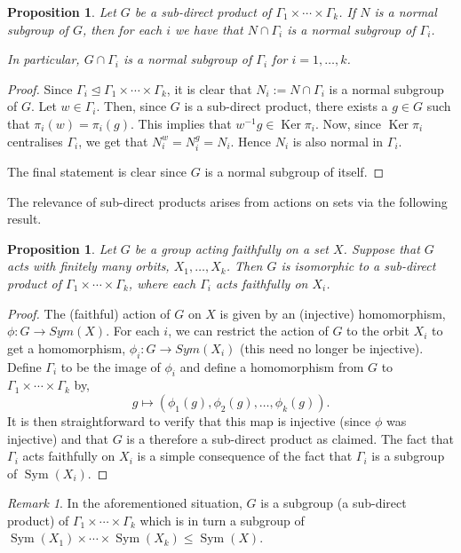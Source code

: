 \documentclass[11pt,a4paper]{amsart}
\newtheorem{proposition}[theorem]{Proposition}
\theoremstyle{definition}
\theoremstyle{remark}
\newtheorem{remark}[theorem]{Remark}
\newcommand{\Sym}{\operatorname{Sym}}
\renewcommand{\ker}{\operatorname{Ker}}
\begin{document}
\begin{proposition}
	\label{normal in subdirect}
	Let $G$ be a sub-direct product of $\Gamma_1\times\cdots\times\Gamma_k$. If $N$ is a normal subgroup of $G$, then for each $i$ we have that $N \cap \Gamma_i$ is a normal subgroup of $\Gamma_i$. 
	
	In particular, $G \cap \Gamma_i$ is a normal subgroup of $\Gamma_i$ for $i=1, \ldots, k$.
\end{proposition}
\begin{proof}
	Since $\Gamma_i\unlhd \Gamma_1\times\cdots\times\Gamma_k$, it is clear that $N_i:= N \cap \Gamma_i$ is a normal subgroup of $G$. Let $w \in \Gamma_i$. Then, since $G$ is a sub-direct product, there exists a $g \in G$ such that $\pi_i(w)=\pi_i(g)$. This implies that $w^{-1} g \in \ker \pi_i$. Now, since $\ker \pi_i$ centralises $\Gamma_i$, we get that $N_i^w=N_i^g=N_i$. Hence $N_i$ is also normal in $\Gamma_i$.
	
	The final statement is clear since $G$ is a normal subgroup of itself.   
\end{proof}

The relevance of sub-direct products arises from actions on sets via the following result. 

\begin{proposition}
	\label{actions and subdirect}
	Let $G$ be a group acting faithfully on a set $X$. Suppose that $G$ acts with finitely many orbits, $X_1, \ldots, X_k$. Then $G$ is isomorphic to a sub-direct product of $\Gamma_1 \times \cdots \times \Gamma_k$, where each $\Gamma_i$ acts faithfully on $X_i$. 
\end{proposition}
\begin{proof}
	The (faithful) action of $G$ on $X$ is given by an (injective) homomorphism, $\phi: G \to Sym(X)$. For each $i$, we can restrict the action of $G$ to the orbit $X_i$ to get a homomorphism, $\phi_i: G \to Sym(X_i)$ (this need no longer be injective). Define $\Gamma_i$ to be the image of $\phi_i$ and define a homomorphism from $G$ to $\Gamma_1 \times \cdots \times \Gamma_k$ by, 
	$$
	g \mapsto (\phi_1(g), \phi_2(g), \ldots, \phi_k(g)).
	$$ 
	It is then straightforward to verify that this map is injective (since $\phi$ was injective) and that $G$ is a therefore a sub-direct product as claimed. The fact that $\Gamma_i$ acts faithfully on $X_i$ is a simple consequence of the fact that $\Gamma_i$ is a subgroup of $\Sym(X_i)$. 
\end{proof}


\begin{remark}
	In the aforementioned situation, $G$ is a subgroup (a sub-direct product) of $\Gamma_1 \times \cdots \times \Gamma_k$ which is in turn a subgroup of $\Sym(X_1) \times \cdots \times \Sym(X_k) \leq \Sym(X)$. 
\end{remark}
\end{document}
